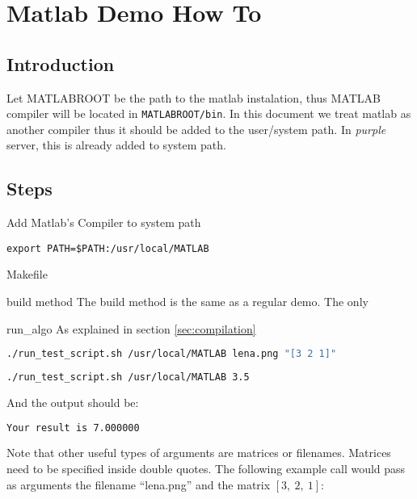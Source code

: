\section{Matlab Demo How To}
\subsection{Introduction}
Let MATLABROOT be the path to the matlab instalation, thus MATLAB compiler will be located in \texttt{MATLABROOT/bin}.
In this document we treat matlab as another compiler thus it should be added to the user/system path.
In \emph{purple} server, this is already added to system path.

\subsection{Steps}
Add Matlab's Compiler to system path
\begin{lstlisting}
export PATH=$PATH:/usr/local/MATLAB
\end{lstlisting}

Makefile

build method
The build method is the same as a regular demo. The only

run_algo
As explained in section \ref{sec:compilation}
\begin{lstlisting}[language=bash]
./run_test_script.sh /usr/local/MATLAB lena.png "[3 2 1]" 
\end{lstlisting}

\begin{lstlisting}[language=bash]
./run_test_script.sh /usr/local/MATLAB 3.5
\end{lstlisting}

And the output should be:

\begin{lstlisting}[language=bash]
Your result is 7.000000
\end{lstlisting}

Note that other useful types of arguments are matrices or filenames. Matrices
need to be specified inside double quotes. The following example call would pass as arguments the filename ``lena.png'' and the matrix $[3,~2,~1]$:



